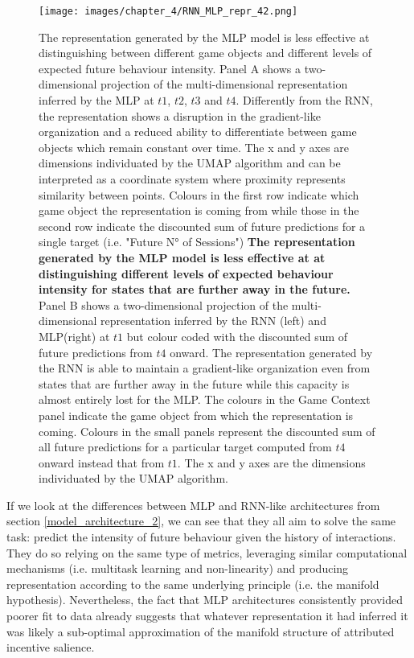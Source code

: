 \begin{figure}[ht]
\centering
\texttt{[image: images/chapter\_4/RNN\_MLP\_repr\_42.png]}
\caption[Lower dimensional representation of the latent states generated by the time-distributed MLP architecture]{The representation generated by the MLP model is less effective at distinguishing between different game objects and different levels of expected future behaviour intensity. Panel A shows a two-dimensional projection of the multi-dimensional representation inferred by the MLP at $t1$, $t2$, $t3$ and $t4$. Differently from the RNN, the representation shows a disruption in the gradient-like organization and a reduced ability to differentiate between game objects which remain constant over time. The x and y axes are dimensions individuated by the UMAP algorithm and can be interpreted as a coordinate system where proximity represents similarity between points. Colours in the first row indicate which game object the representation is coming from while those in the second row indicate the discounted sum of future predictions for a single target (i.e. "Future N° of Sessions") \textbf{The representation generated by the MLP model is less effective at at distinguishing different levels of expected behaviour intensity for states that are further away in the future.} Panel B shows a two-dimensional projection of the multi-dimensional representation inferred by the RNN (left) and MLP(right) at $t1$ but colour coded with the discounted sum of future predictions from $t4$ onward. The representation generated by the RNN is able to maintain a gradient-like organization even from states that are further away in the future while this capacity is almost entirely lost for the MLP. The colours in the Game Context panel indicate the game object from which the representation is coming. Colours in the small panels represent the discounted sum of all future predictions for a particular target computed from $t4$ onward instead that from $t1$. The x and y axes are the dimensions individuated by the UMAP algorithm.}
\label{predictive_panel}
\end{figure}

If we look at the differences between MLP and RNN-like architectures from section \ref{model_architecture_2}, we can see that they all aim to solve the same task: predict the intensity of future behaviour given the history of interactions. They do so relying on the same type of metrics, leveraging similar computational mechanisms (i.e. multitask learning and non-linearity) and producing representation according to the same underlying principle (i.e. the manifold hypothesis). Nevertheless, the fact that MLP architectures consistently provided poorer fit to data already suggests that whatever representation it had inferred it was likely a sub-optimal approximation of the manifold structure of attributed incentive salience. 

